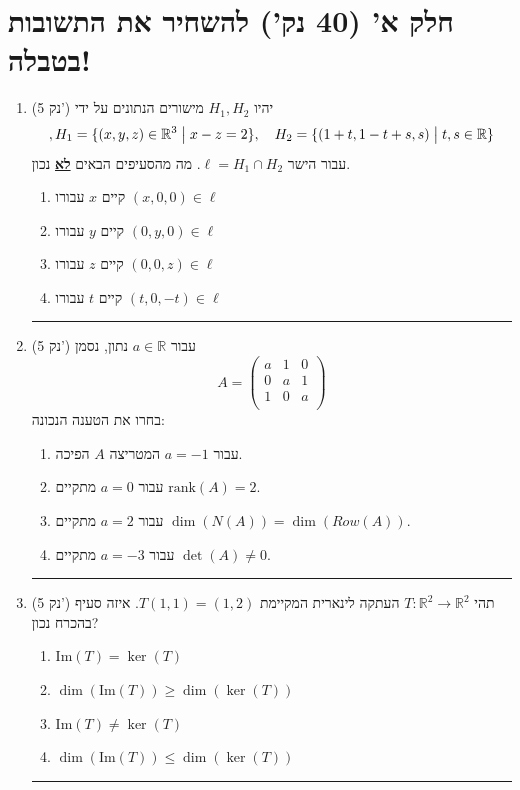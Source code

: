 \documentclass[12pt, a4paper]{article}
\newcommand{\rr}{\mathbb{R}}
\newcommand{\im}{\mathrm{Im}}
\newcommand{\points}[1]{(#1 נק') }
\begin{document}
\section*{
חלק א' 
(40 נק')
להשחיר את התשובות בטבלה!}
\begin{enumerate}
\item\points{5}
יהיו
$H_1,H_2$
מישורים הנתונים על ידי 
$$,H_1=\{
(x,y,z)\in\rr^3 \bigm| x-z=2\},\quad H_2=\{
(1+t, 1-t+s, s)
\bigm| t,s\in\rr\}$$
עבור
הישר
$\ell= H_1\cap H_2$.
מה מהסעיפים הבאים \underline{\textbf{לא}} נכון.
\begin{enumerate}
\item
קיים
$x$
עבורו
$(x,0,0)\in \ell$
\item
קיים
$y$
עבורו
$(0,y,0)\in \ell$
\item
קיים
$z$
עבורו
$(0,0,z)\in \ell$
\item
קיים
$t$
עבורו
$(t,0,-t)\in \ell$
\end{enumerate}

\noindent\rule{\textwidth-30pt}{0.4pt}


\item\points{5}
עבור
$a\in\rr$
נתון, נסמן
$$A=\begin{pmatrix}
a&1&0\\
0&a&1\\
1&0&a\\
\end{pmatrix}$$
בחרו את הטענה הנכונה:
\begin{enumerate}
\item
עבור
$a=-1$
המטריצה
$A$
הפיכה.
\item
עבור
$a=0$
מתקיים
$\mathrm{rank}(A)=2$.
\item
עבור
$a=2$
מתקיים
$\dim(N(A))=\dim(Row(A))$.
\item
עבור
$a=-3$
מתקיים
$\det(A)\neq0$.
\end{enumerate}

\noindent\rule{\textwidth-30pt}{0.4pt}

\item\points{5}
תהי $T:\rr^2\to \rr^2$ העתקה לינארית המקיימת
$T(1,1) = (1,2)$.
איזה סעיף בהכרח נכון?
\begin{enumerate}
\item $\im(T)=\ker(T)$
\item $\dim(\im(T))\geq \dim(\ker(T))$
\item $\im(T)\neq \ker(T)$
\item $\dim(\im(T))\leq \dim(\ker(T))$
\end{enumerate}
\noindent\rule{\textwidth-30pt}{0.4pt}



\end{enumerate}
\end{document}
